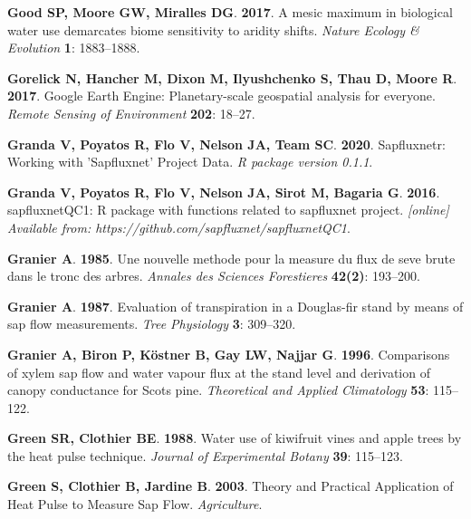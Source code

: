 \documentclass[11pt,twoside]{reedthesis}
\begin{document}
\hypertarget{ref-good2017}{}
\textbf{\textnormal{Good SP}, \textnormal{Moore GW},
\textnormal{Miralles DG}}. \textbf{2017}. A mesic maximum in biological
water use demarcates biome sensitivity to aridity shifts. \emph{Nature
Ecology \& Evolution} \textbf{1}: 1883--1888.

\hypertarget{ref-gorelick_google_2017}{}
\textbf{\textnormal{Gorelick N}, \textnormal{Hancher M},
\textnormal{Dixon M}, \textnormal{Ilyushchenko S}, \textnormal{Thau D},
\textnormal{Moore R}}. \textbf{2017}. Google Earth Engine:
Planetary-scale geospatial analysis for everyone. \emph{Remote Sensing
of Environment} \textbf{202}: 18--27.

\hypertarget{ref-granda_sapfluxnetr_2020}{}
\textbf{\textnormal{Granda V}, \textnormal{Poyatos R}, \textnormal{Flo
V}, \textnormal{Nelson JA}, \textnormal{Team SC}}. \textbf{2020}.
Sapfluxnetr: Working with 'Sapfluxnet' Project Data. \emph{R package
version 0.1.1}.

\hypertarget{ref-granda2016}{}
\textbf{\textnormal{Granda V}, \textnormal{Poyatos R}, \textnormal{Flo
V}, \textnormal{Nelson JA}, \textnormal{Sirot M}, \textnormal{Bagaria
G}}. \textbf{2016}. sapfluxnetQC1: R package with functions related to
sapfluxnet project. \emph{{[}online{]} Available from:
https://github.com/sapfluxnet/sapfluxnetQC1}.

\hypertarget{ref-Granier1985}{}
\textbf{\textnormal{Granier A}}. \textbf{1985}. Une nouvelle methode
pour la measure du flux de seve brute dans le tronc des arbres.
\emph{Annales des Sciences Forestieres} \textbf{42(2)}: 193--200.

\hypertarget{ref-Granier1987}{}
\textbf{\textnormal{Granier A}}. \textbf{1987}. Evaluation of
transpiration in a Douglas-fir stand by means of sap flow measurements.
\emph{Tree Physiology} \textbf{3}: 309--320.

\hypertarget{ref-Granier1996}{}
\textbf{\textnormal{Granier A}, \textnormal{Biron P},
\textnormal{Köstner B}, \textnormal{Gay LW}, \textnormal{Najjar G}}.
\textbf{1996}. Comparisons of xylem sap flow and water vapour flux at
the stand level and derivation of canopy conductance for Scots pine.
\emph{Theoretical and Applied Climatology} \textbf{53}: 115--122.

\hypertarget{ref-Green1988}{}
\textbf{\textnormal{Green SR}, \textnormal{Clothier BE}}. \textbf{1988}.
Water use of kiwifruit vines and apple trees by the heat pulse
technique. \emph{Journal of Experimental Botany} \textbf{39}: 115--123.

\hypertarget{ref-Green2003}{}
\textbf{\textnormal{Green S}, \textnormal{Clothier B},
\textnormal{Jardine B}}. \textbf{2003}. Theory and Practical Application
of Heat Pulse to Measure Sap Flow. \emph{Agriculture}.
\end{document}
